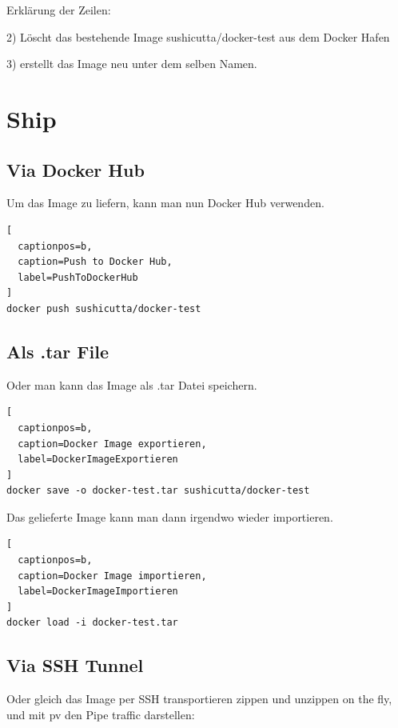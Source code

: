 Erklärung der Zeilen:

2) Löscht das bestehende Image sushicutta/docker-test aus dem Docker Hafen

3) erstellt das Image neu unter dem selben Namen.

\section{Ship}

\subsection{Via Docker Hub}

Um das Image zu liefern, kann man nun Docker Hub verwenden.
\\

\begin{lstlisting}[
  captionpos=b,
  caption=Push to Docker Hub,
  label=PushToDockerHub
]
docker push sushicutta/docker-test
\end{lstlisting}

\subsection{Als .tar File}

Oder man kann das Image als .tar Datei speichern.
\\

\begin{lstlisting}[
  captionpos=b,
  caption=Docker Image exportieren,
  label=DockerImageExportieren
]
docker save -o docker-test.tar sushicutta/docker-test
\end{lstlisting}

Das gelieferte Image kann man dann irgendwo wieder importieren.
\\

\begin{lstlisting}[
  captionpos=b,
  caption=Docker Image importieren,
  label=DockerImageImportieren
]
docker load -i docker-test.tar
\end{lstlisting}

\subsection{Via SSH Tunnel}

Oder gleich das Image per SSH transportieren zippen und unzippen on the fly, und mit pv den
Pipe traffic darstellen:
\\


